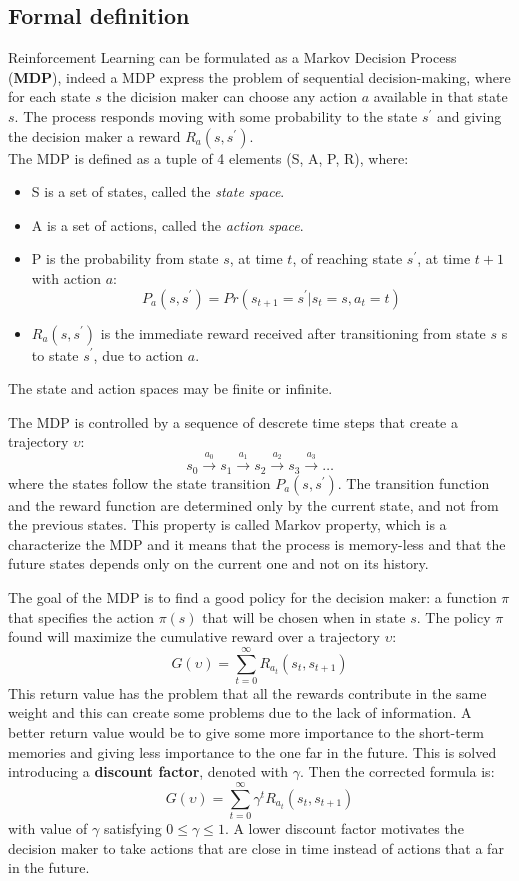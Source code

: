 \documentclass[14pt]{extarticle}
\def\sp{\vspace{5pt}}
\def\ppn{\vspace{10pt}}
\begin{document}
\begin{flushleft}
\subsection{Formal definition}
\sp
Reinforcement Learning can be formulated as a Markov Decision Process (\textbf{MDP}), indeed a MDP express the problem of sequential decision-making, where for each state $s$ the dicision maker can choose any action $a$ available in that state $s$. The process responds moving with some probability to the state $s^\prime$ and giving the decision maker a reward $R_a(s,s^\prime)$. %
\\
The MDP is defined as a tuple of 4 elements (S, A, P, R), where:
\begin{itemize}
\item S is a set of states, called the \emph{state space}.
\item A is a set of actions, called the \emph{action space}.
\item P is the probability from state $s$, at time $t$, of reaching state $s^\prime$, at time $t+1$ with action $a$:
\[P_a(s,s^\prime) = Pr(s_{t+1} = s^\prime | s_t = s, a_t = t)\]
\item $R_a(s,s^\prime)$ is the immediate reward received after transitioning from state $s$ s to state $s^\prime$, due to action $a$.
\end{itemize}
The state and action spaces may be finite or infinite.

\ppn
The MDP is controlled by a sequence of descrete time steps that create a trajectory $\upsilon$:
\[s_0 \xrightarrow{a_0} s_1 \xrightarrow{a_1} s_2 \xrightarrow{a_2} s_3 \xrightarrow{a_3} \dotso\]
where the states follow the state transition $P_a(s,s^\prime)$. The transition function and the reward function are determined only by the current state, and not from the previous states. This property is called Markov property, which is a characterize the MDP and it means that the process is memory-less and that the future states depends only on the current one and not on its history.

\ppn
The goal of the MDP is to find a good policy for the decision maker: a function $\pi$ that specifies the action $\pi(s)$ that will be chosen when in state $s$. The policy $\pi$ found will maximize the cumulative reward over a trajectory $\upsilon$:
\[ G(\upsilon) = \sum_{t=0}^{\infty} R_{a_t}(s_t, s_{t+1}) \] 
This return value has the problem that all the rewards contribute in the same weight and this can create some problems due to the lack of information. A better return value would be to give some more importance to the short-term memories and giving less importance to the one far in the future. This is solved introducing a \textbf{discount factor}, denoted with $\gamma$. Then the corrected formula is:
\[ G(\upsilon) = \sum_{t=0}^{\infty} \gamma^t R_{a_t}(s_t, s_{t+1}) \]
with value of $\gamma$ satisfying $ 0 \leq \gamma \leq 1$. A lower discount factor motivates the decision maker to take actions that are close in time instead of actions that a far in the future.


\end{flushleft}
\end{document}
